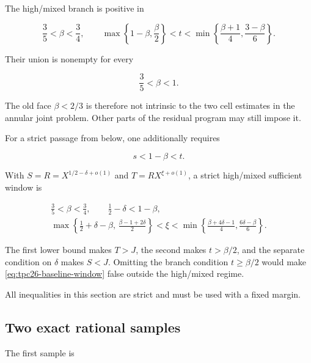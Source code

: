 The high/mixed branch is positive in

\begin{equation}
 \boxed{
 \frac35<\beta<\frac34,
 \qquad
 \max\left\{1-\beta,\frac\beta2\right\}
 <t<
 \min\left\{\frac{\beta+1}{4},
 \frac{3-\beta}{6}\right\}.}
 \label{eq:tpc26-high-crossing-window}
\end{equation}

Their union is nonempty for every

\begin{equation}
 \boxed{\frac35<\beta<1.}
 \label{eq:tpc26-total-beta-window}
\end{equation}

The old face \(\beta<2/3\) is therefore not intrinsic to the two
cell estimates in the annular joint problem.  Other parts of the
residual program may still impose it.

For a strict passage from below, one additionally requires

\begin{equation}
 s<1-\beta<t.
 \label{eq:tpc26-strict-passage}
\end{equation}

With \(S=R=X^{1/2-\delta+o(1)}\) and
\(T=RX^{\xi+o(1)}\), a strict high/mixed sufficient window is

\begin{equation}
 \boxed{\begin{gathered}
 \frac35<\beta<\frac34,\qquad
 \frac12-\delta<1-\beta,\\
 \max\left\{
 \frac12+\delta-\beta,\,
 \frac{\beta-1+2\delta}{2}
 \right\}<\xi<
 \min\left\{
 \frac{\beta+4\delta-1}{4},
 \frac{6\delta-\beta}{6}
 \right\}.
 \end{gathered}}
 \label{eq:tpc26-baseline-window}
\end{equation}

The first lower bound makes \(T>J\), the second makes
\(t>\beta/2\), and the separate condition on \(\delta\) makes
\(S<J\).  Omitting the branch condition \(t\ge\beta/2\) would make
\eqref{eq:tpc26-baseline-window} false outside the high/mixed regime.

All inequalities in this section are strict and must be used with a
fixed margin.

\subsection{Two exact rational samples}

The first sample is


